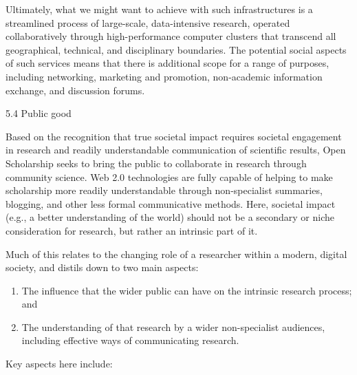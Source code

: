 \documentclass[]{article}
\begin{document}
Ultimately, what we might want to achieve with such infrastructures is a
streamlined process of large-scale, data-intensive research, operated
collaboratively through high-performance computer clusters that
transcend all geographical, technical, and disciplinary boundaries. The
potential social aspects of such services means that there is additional
scope for a range of purposes, including networking, marketing and
promotion, non-academic information exchange, and discussion forums.

5.4 Public good

Based on the recognition that true societal impact requires societal
engagement in research and readily understandable communication of
scientific results, Open Scholarship seeks to bring the public to
collaborate in research through community science. Web 2.0 technologies
are fully capable of helping to make scholarship more readily
understandable through non-specialist summaries, blogging, and other
less formal communicative methods. Here, societal impact (e.g., a better
understanding of the world) should not be a secondary or niche
consideration for research, but rather an intrinsic part of it.

Much of this relates to the changing role of a researcher within a
modern, digital society, and distils down to two main aspects:

\begin{enumerate}
\def\labelenumi{\arabic{enumi}.}
\item
  The influence that the wider public can have on the intrinsic research
  process; and
\item
  The understanding of that research by a wider non-specialist
  audiences, including effective ways of communicating research.
\end{enumerate}

Key aspects here include:
\end{document}
